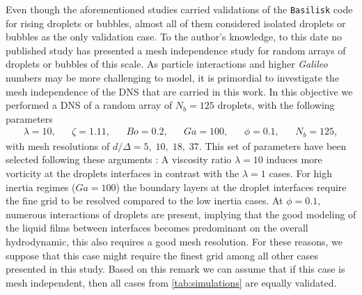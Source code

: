 Even though the aforementioned studies carried validations of the \texttt{Basilisk} code for rising droplets or bubbles, almost all of them considered isolated droplets or bubbles as the only validation case. 
To the author's knowledge, to this date no published study has presented a mesh independence study for random arrays of droplets or bubbles of this scale. 
As particle interactions and higher \textit{Galileo} numbers may be more challenging to model, it is primordial to investigate the mesh independence of the DNS that are carried in this work. 
In this objective we performed a DNS of a random array of $N_b=125$ droplets, with the following parameters
\begin{align*}
    \lambda = 10,
    && \zeta = 1.11,
    && Bo = 0.2,
    && Ga = 100,
    && \phi = 0.1,
    && N_b =125,
\end{align*}
with mesh resolutions of $d/\Delta = 5,\; 10,\; 18,\; 37$. 
This set of parameters have been selected following these arguments :
A viscosity ratio $\lambda = 10$ induces more vorticity at the droplets interfaces in contrast with the $\lambda = 1$ cases. 
For high inertia regimes ($Ga = 100$) the boundary layers at the droplet interfaces require the fine grid to be resolved compared to the low inertia cases. 
At $\phi = 0.1$, numerous interactions of droplets are present, implying that the good modeling of the liquid films between interfaces becomes predominant on the overall hydrodynamic, this also requires a good mesh resolution. 
For these reasons, we suppose that this case might require the finest grid among all other cases presented in this study. 
Based on this remark we can assume that if this case is mesh independent, then all cases from \ref{tab:simulations} are equally validated. 

